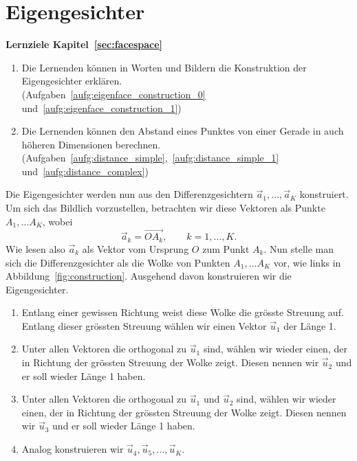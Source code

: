 \section{Eigengesichter} \label{sec:eigenfaces}
\begin{tcolorbox}
	\centerline{\textbf{Lernziele Kapitel~\ref{sec:facespace}}}
	\begin{enumerate}[leftmargin=*,label=\thesection.\arabic*]
		\item \label{item:eigenfaces} Die Lernenden können in Worten und Bildern die Konstruktion der Eigengesichter erklären.\\
		(Aufgaben~\ref{aufg:eigenface_construction_0} und~\ref{aufg:eigenface_construction_1})
		\item \label{item:distance} Die Lernenden können den Abstand eines Punktes von einer Gerade in auch höheren Dimensionen berechnen.\\
		(Aufgaben~\ref{aufg:distance_simple},~\ref{aufg:distance_simple_1} und~\ref{aufg:distance_complex})
	\end{enumerate}
\end{tcolorbox}
Die Eigengesichter werden nun aus den Differenzgesichtern $\vec a_1,\ldots,\vec a_K$ konstruiert.
Um sich das Bildlich vorzustellen, betrachten wir diese Vektoren als Punkte $A_1,\ldots A_K$, wobei
\begin{equation*}
	\vec{a}_k=\overrightarrow{OA_k},\qquad k=1,\ldots,K.
\end{equation*}
Wie lesen also $\vec{a}_k$ als Vektor vom Ursprung $O$ zum Punkt $A_k$.
Nun stelle man sich die Differenzgesichter als die \glqq{}Wolke\grqq{} von Punkten $A_1,\ldots A_K$ vor, wie links in Abbildung~\ref{fig:construction}.
Ausgehend davon konstruieren wir die Eigengesichter.
\begin{enumerate}[leftmargin=2cm, label=Schritt \arabic*]
	\item Entlang einer gewissen Richtung weist diese Wolke die grösste Streuung auf.
	Entlang dieser grössten Streuung wählen wir einen Vektor $\vec u_1$ der Länge 1.
	\item \label{item:u2} Unter allen Vektoren die orthogonal zu $\vec u_1$ sind, wählen wir wieder einen, der in Richtung der grössten Streuung der Wolke zeigt.
	Diesen nennen wir $\vec u_2$ und er soll wieder Länge 1 haben.
	\item Unter allen Vektoren die orthogonal zu $\vec u_1$ und $\vec u_2$ sind, wählen wir wieder einen, der in Richtung der grössten Streuung der Wolke zeigt.
	Diesen nennen wir $\vec u_3$ und er soll wieder Länge 1 haben.
	\item Analog konstruieren wir $\vec u_4,\vec u_5,\ldots,\vec u_K$.
\end{enumerate}
